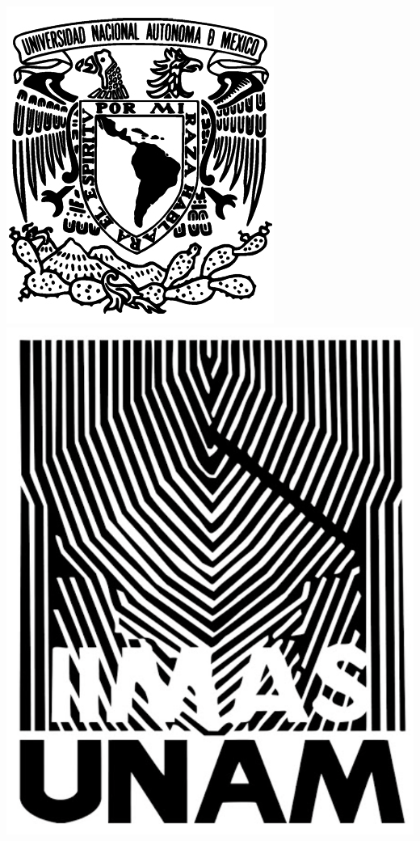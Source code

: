 \documentclass{article}
\begin{document}

\vspace{2cm}
\begin{center}
    \includegraphics[scale=1.6]{logo-unam-bw.jpg}
    \hspace{6cm}
    \includegraphics[scale=0.29]{imgs/logo-iimas.png}
\end{center}
\end{document}
